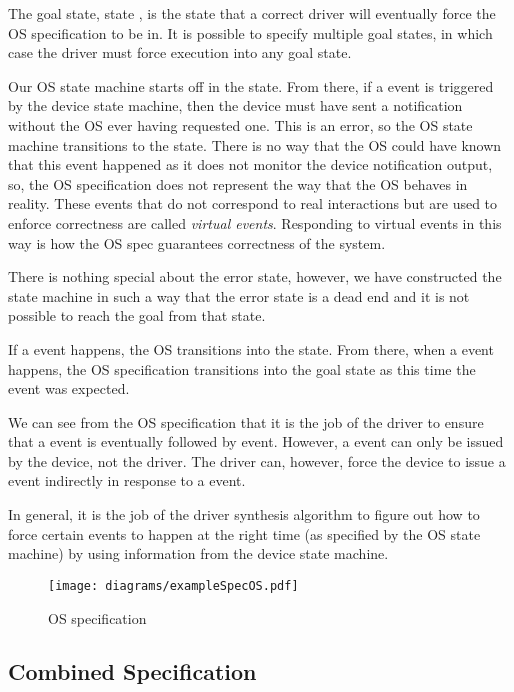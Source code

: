 The goal state, state , is the state that a correct driver will eventually force the OS specification to be in. It is possible to specify multiple goal states, in which case the driver must force execution into any goal state.

Our OS state machine starts off in the  state. From there, if a  event is triggered by the device state machine, then the device must have sent a notification without the OS ever having requested one. This is an error, so the OS state machine transitions to the  state. There is no way that the OS could have known that this event happened as it does not monitor the device notification output, so, the OS specification does not represent the way that the OS behaves in reality. These events that do not correspond to real interactions but are used to enforce correctness are called \emph{virtual events}. Responding to virtual events in this way is how the OS spec guarantees correctness of the system. 

There is nothing special about the error state, however, we have constructed the state machine in such a way that the error state is a dead end and it is not possible to reach the goal from that state.

If a  event happens, the OS transitions into the  state. From there, when a  event happens, the OS specification transitions into the goal state as this time the  event was expected. 

We can see from the OS specification that it is the job of the driver to ensure that a  event is eventually followed by  event. However, a  event can only be issued by the device, not the driver. The driver can, however, force the device to issue a  event indirectly in response to a  event. 

In general, it is the job of the driver synthesis algorithm to figure out how to force certain events to happen at the right time (as specified by the OS state machine) by using information from the device state machine. 

\begin{figure}
\centering
\texttt{[image: diagrams/exampleSpecOS.pdf]}
\caption{OS specification}
\label{fig:os_spec}
\end{figure}

\subsection{Combined Specification}


